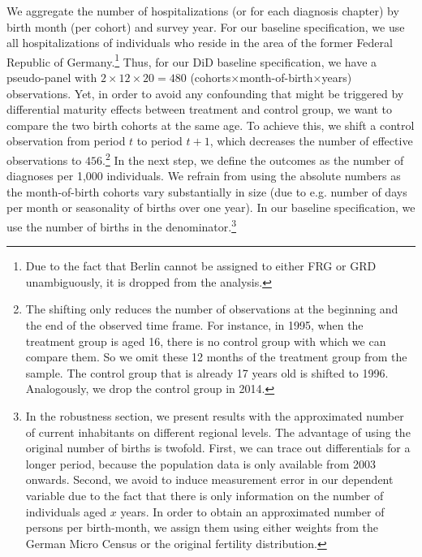 \documentclass[11pt, a4paper]{article} %
\begin{document}
We aggregate the number of hospitalizations (or for each diagnosis chapter) by birth month (per cohort) and survey year. For our baseline specification, we use all hospitalizations of individuals who reside in the area of the former Federal Republic of Germany.\footnote{Due to the fact that Berlin cannot be assigned to either FRG or GRD unambiguously, it is dropped from the analysis.} Thus, for our DiD baseline specification, we have a pseudo-panel with $2\times12\times20=480$ (cohorts$\times$month-of-birth$\times$years) observations. Yet, in order to avoid any confounding that might be triggered by differential maturity effects between treatment and control group, we want to compare the two birth cohorts at the same age. To achieve this, we shift a control observation from period $t$ to period $t+1$, which decreases the number of effective observations to $456$.\footnote{The shifting only reduces the number of observations at the beginning and the end of the observed time frame. For instance, in 1995, when the treatment group is aged 16, there is no control group with which we can compare them. So we omit these 12 months of the treatment group from the sample. The control group that is already 17 years old is shifted to 1996. Analogously, we drop the control group in 2014.} \newline %
In the next step, we define the outcomes as the number of diagnoses per 1,000 individuals. We refrain from using the absolute numbers as the month-of-birth cohorts vary substantially in size (due to e.g. number of days per month or seasonality of births over one year). In our baseline specification, we use the number of births in the denominator.\footnote{In the robustness section, we present results with the approximated number of current inhabitants on different regional levels. The advantage of using the original number of births is twofold. First, we can trace out differentials for a longer period, because the population data is only available from 2003 onwards. Second, we avoid to induce measurement error in our dependent variable due to the fact that there is only information on the number of individuals aged $x$ years. In order to obtain an approximated number of persons per birth-month, we assign them using either weights from the German Micro Census or the original fertility distribution.} \newline
 
\end{document}
